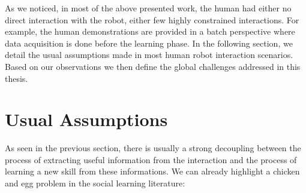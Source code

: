 As we noticed, in most of the above presented work, the human had either no direct interaction with the robot, either few highly constrained interactions. For example, the human demonstrations are provided in a batch perspective where data acquisition is done before the learning phase. In the following section, we detail the usual assumptions made in most human robot interaction scenarios.  Based on our observations we then define the global challenges addressed in this thesis.

\section{Usual Assumptions}


As seen in the previous section, there is usually a strong decoupling between the process of extracting useful information from the interaction and the process of learning a new skill from these informations. We can already highlight a chicken and egg problem in the social learning literature:

